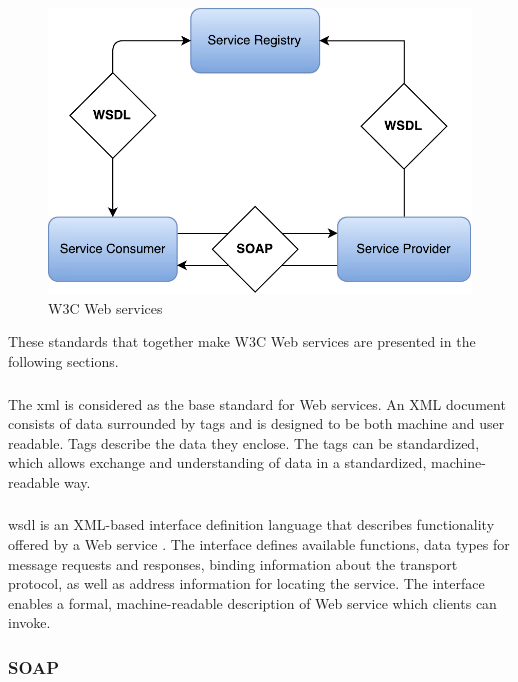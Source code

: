 \begin{figure}[h]
\centering
\includegraphics[scale=0.6]{images/web_services.pdf}
\caption{W3C Web services}
\label{figure-w3c-web-services}
\end{figure}

These standards that together make W3C Web services are presented in the
following sections.

\subsubsection{}

The \gls{xml}\cite{W3C-XML} is considered as the base standard for Web services.
An XML document consists of data surrounded by tags and is designed to be both
machine and user readable. Tags describe the data they enclose. The tags can be
standardized, which allows exchange and understanding of data in a standardized,
machine-readable way.


\subsubsection{}

\gls{wsdl} is an XML-based interface definition language that describes
functionality offered by a Web service \cite{w3c-wsdl}. The interface defines
available functions, data types for message requests and responses, binding
information about the transport protocol, as well as address information for
locating the service. The interface enables a formal, machine-readable
description of Web service which clients can invoke.

\subsubsection{SOAP}

